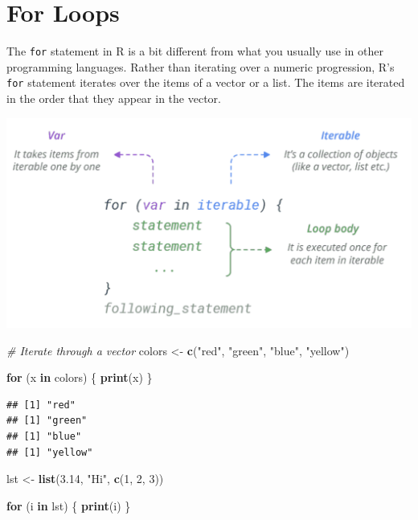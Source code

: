 \documentclass[
]{book}
\newenvironment{Shaded}{\begin{snugshade}}{\end{snugshade}}
\newcommand{\CommentTok}[1]{\textcolor[rgb]{0.56,0.35,0.01}{\textit{#1}}}
\newcommand{\ControlFlowTok}[1]{\textcolor[rgb]{0.13,0.29,0.53}{\textbf{#1}}}
\newcommand{\DecValTok}[1]{\textcolor[rgb]{0.00,0.00,0.81}{#1}}
\newcommand{\FloatTok}[1]{\textcolor[rgb]{0.00,0.00,0.81}{#1}}
\newcommand{\KeywordTok}[1]{\textcolor[rgb]{0.13,0.29,0.53}{\textbf{#1}}}
\newcommand{\NormalTok}[1]{#1}
\newcommand{\StringTok}[1]{\textcolor[rgb]{0.31,0.60,0.02}{#1}}
\begin{document}
\hypertarget{for-loops}{%
\section{For Loops}\label{for-loops}}

The \texttt{for} statement in R is a bit different from what you usually use in other programming languages. Rather than iterating over a numeric progression, R's \texttt{for} statement iterates over the items of a vector or a list. The items are iterated in the order that they appear in the vector.

\begin{center}\includegraphics[width=16.11in]{images/ForLoop} \end{center}

\begin{Shaded}
\begin{Highlighting}[]
\CommentTok{# Iterate through a vector}
\NormalTok{colors <-}\StringTok{ }\KeywordTok{c}\NormalTok{(}\StringTok{"red"}\NormalTok{, }\StringTok{"green"}\NormalTok{, }\StringTok{"blue"}\NormalTok{, }\StringTok{"yellow"}\NormalTok{)}

\ControlFlowTok{for}\NormalTok{ (x }\ControlFlowTok{in}\NormalTok{ colors) \{}
    \KeywordTok{print}\NormalTok{(x)}
\NormalTok{\}}
\end{Highlighting}
\end{Shaded}

\begin{verbatim}
## [1] "red"
## [1] "green"
## [1] "blue"
## [1] "yellow"
\end{verbatim}

\begin{Shaded}
\begin{Highlighting}[]
\NormalTok{lst <-}\StringTok{ }\KeywordTok{list}\NormalTok{(}\FloatTok{3.14}\NormalTok{, }\StringTok{"Hi"}\NormalTok{, }\KeywordTok{c}\NormalTok{(}\DecValTok{1}\NormalTok{, }\DecValTok{2}\NormalTok{, }\DecValTok{3}\NormalTok{))}

\ControlFlowTok{for}\NormalTok{ (i }\ControlFlowTok{in}\NormalTok{ lst) \{}
    \KeywordTok{print}\NormalTok{(i)}
\NormalTok{\}}
\end{Highlighting}
\end{Shaded}
\end{document}

